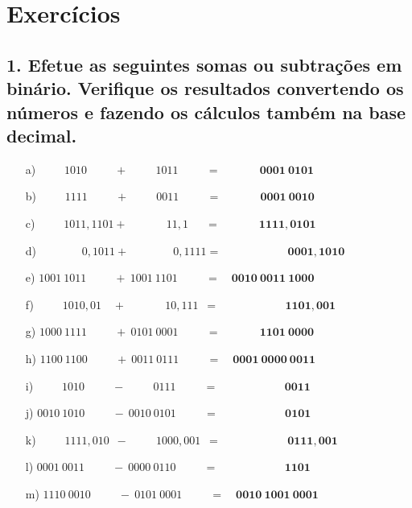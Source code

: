 \documentclass[a4paper, 12pt]{article}
\begin{document}
\section*{Exercícios}

\subsection*{1. Efetue as seguintes somas ou subtrações em binário. Verifique os resultados convertendo os números e fazendo os cálculos também na base decimal.}
\begin{enumerate}
    \item[a)] \(        \phantom{0001\ } 1010 \phantom{,0100}+ \phantom{\ 0000\ }1011 \phantom{,0010}        = \quad      \phantom{0000\ } \mathbf{\ 0001\ 0101}\)
    \item[b)] \(        \phantom{0001\ } 1111 \phantom{,0100}+ \phantom{\ 0000\ }0011 \phantom{,0010}        = \quad      \phantom{0000\ } \mathbf{\ 0001\ 0010}\)
    \item[c)] \(         \phantom{0001\ }1011,1101           + \phantom{\ 0000\ 00}11,1 \phantom{000}        = \quad            \phantom{0000\ } \mathbf{\ 1111,0101}\)
    \item[d)] \(         \phantom{0001\ 000}0,1011           + \phantom{\ 0000\ 000}0,1111                   = \quad    \phantom{0000\ 0000\ } \mathbf{\ \ 0001,1010}\)
    \item[e)] \(                   1001\ 1011 \phantom{,0100} +           \ 1001\ 1101 \phantom{,0010}       = \quad                   \mathbf{0010\ 0011\ 1000}\)
    \item[f)] \(         \phantom{0001\ }1010,01\phantom{00}  + \phantom{\ 0001\ 00}10,111\phantom{0}        = \quad     \phantom{0000\ 0000\ }\mathbf{\ \ 1101,001}\)
    \item[g)] \(                   1000\ 1111 \phantom{,0100} +           \ 0101\ 0001 \phantom{,0010}       = \quad      \phantom{0010\ } \mathbf{\ 1101\ 0000}\)
    \item[h)] \(                   1100\ 1100 \phantom{,0100} +           \ 0011\ 0111 \phantom{,0010}       = \quad                   \mathbf{0001\ 0000\ 0011}\)
    \item[i)] \(         \phantom{0001\ }1010 \phantom{,0100} - \phantom{\ 0000\ }0111       \phantom{,0010} = \quad    \phantom{\ 0001\ 0000\ } \mathbf{\ 0011}\)
    \item[j)] \(                   0010\ 1010 \phantom{,0100} -           \ 0010\ 0101 \phantom{,0010}       = \quad    \phantom{\ 0001\ 0000\ } \mathbf{\ 0101}\)
    \item[k)] \(         \phantom{0001\ }1111,010\phantom{0}  -\phantom{\ 0000 }\ 1000,001\phantom{0}        = \quad    \phantom{\ 0001\ 0000\ } \mathbf{\ 0111,001}\)
    \item[l)] \(                   0001\ 0011  \phantom{,0100} -           \ 0000\ 0110  \phantom{,0010}     = \quad    \phantom{\ 0001\ 0000\ } \mathbf{\ 1101}\)
    \item[m)] \(                   1110\ 0010  \phantom{,0100} -           \ 0101\ 0001  \phantom{,0010}     = \quad                   \mathbf{0010\ 1001\ 0001}\)
\end{enumerate}
\end{document}
